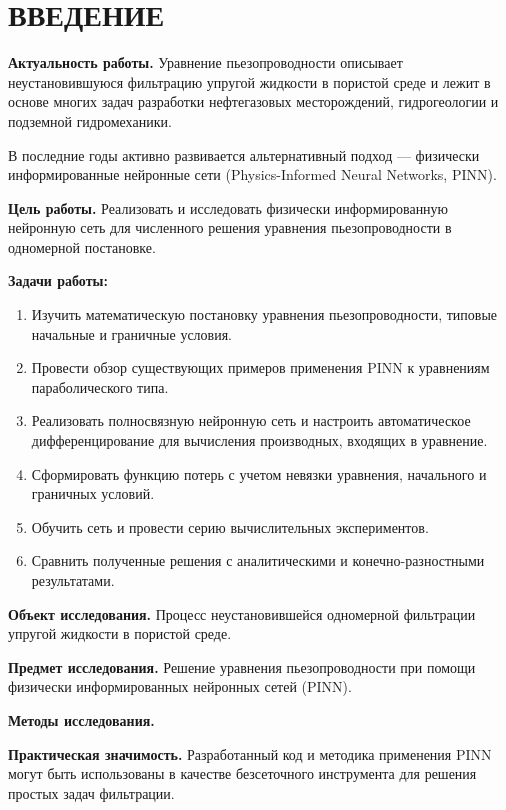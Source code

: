 \documentclass[12pt, a4paper]{article}
\begin{document}
\newpage

\section*{ВВЕДЕНИЕ}

\textbf{Актуальность работы.} Уравнение пьезопроводности описывает неустановившуюся фильтрацию упругой жидкости в пористой среде и лежит в основе многих задач разработки нефтегазовых месторождений, гидрогеологии и подземной гидромеханики.

В последние годы активно развивается альтернативный подход — физически информированные нейронные сети (Physics-Informed Neural Networks, PINN).

\textbf{Цель работы.} Реализовать и исследовать физически информированную нейронную сеть для численного решения уравнения пьезопроводности в одномерной постановке.

\textbf{Задачи работы:}
\begin{enumerate}
    \item Изучить математическую постановку уравнения пьезопроводности, типовые начальные и граничные условия.
    \item Провести обзор существующих примеров применения PINN к уравнениям параболического типа.
    \item Реализовать полносвязную нейронную сеть и настроить автоматическое дифференцирование для вычисления производных, входящих в уравнение.
    \item Сформировать функцию потерь с учетом невязки уравнения, начального и граничных условий.
    \item Обучить сеть и провести серию вычислительных экспериментов.
    \item Сравнить полученные решения с аналитическими и конечно-разностными результатами.
\end{enumerate}

\textbf{Объект исследования.} Процесс неустановившейся одномерной фильтрации упругой жидкости в пористой среде.

\textbf{Предмет исследования.} Решение уравнения пьезопроводности при помощи физически информированных нейронных сетей (PINN).

\textbf{Методы исследования.}

\textbf{Практическая значимость.} Разработанный код и методика применения PINN могут быть использованы в качестве безсеточного инструмента для решения простых задач фильтрации.
\end{document}
